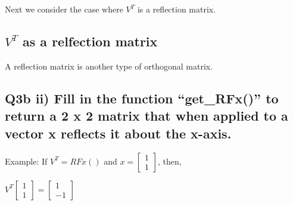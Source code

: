 \documentclass[11pt]{article}
\begin{document}
    \begin{center}
    \end{center}
    { \hspace*{\fill} \\}
    
    \begin{center}
    \end{center}
    { \hspace*{\fill} \\}
    
    Next we consider the case where \(V^T\) is a reflection matrix.

    \hypertarget{vt-as-a-relfection-matrix}{%
\subsection{\texorpdfstring{\(V^T\) as a relfection
matrix}{V\^{}T as a relfection matrix}}\label{vt-as-a-relfection-matrix}}

A reflection matrix is another type of orthogonal matrix.

\hypertarget{q3b-ii-fill-in-the-function-get_rfx-to-return-a-2-x-2-matrix-that-when-applied-to-a-vector-x-reflects-it-about-the-x-axis.}{%
\subsection{Q3b ii) Fill in the function ``get\_RFx()'' to return a 2 x
2 matrix that when applied to a vector x reflects it about the
x-axis.}\label{q3b-ii-fill-in-the-function-get_rfx-to-return-a-2-x-2-matrix-that-when-applied-to-a-vector-x-reflects-it-about-the-x-axis.}}

Example: If \(V^T =RFx()\) and
\(x = \begin{bmatrix}1 \\ 1\end{bmatrix}\), then,

\(V^T \begin{bmatrix}1 \\ 1\end{bmatrix} = \begin{bmatrix}1 \\ -1\end{bmatrix}\)
\end{document}
